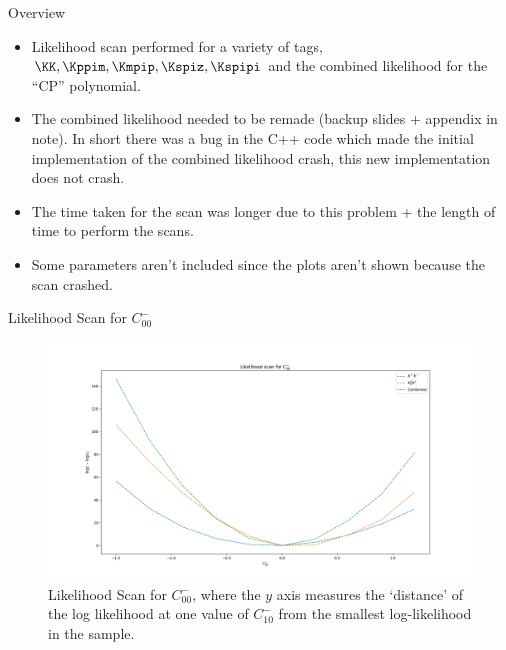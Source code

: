 \begin{frame}{Overview}
    \begin{itemize}
        \item Likelihood scan performed for a variety of tags, $\KK, \Kppim, \Kmpip, \Kspiz, \Kspipi$ and the combined likelihood for the ``CP'' polynomial.
        \item The combined likelihood needed to be remade (backup slides + appendix in note). In short there was a bug in the C++ code which made the initial implementation of the combined likelihood crash, this new implementation does not crash. 
        \item The time taken for the scan was longer due to this problem + the length of time to perform the scans.
        \item Some parameters aren't included since the plots aren't shown because the scan crashed.
    \end{itemize}
\end{frame}

\begin{frame}{Likelihood Scan for $C_{00}^{-}$}
\begin{figure}
    \centering
        \includegraphics[width=\textwidth]{2020_04_23/figs/M00_Norm.png}
    \caption{Likelihood Scan for $C_{00}^{-}$, where the $y$ axis measures the `distance' of the log likelihood at one value of $C_{10}^{-}$ from the smallest log-likelihood in the sample.}
    \label{fig:scanCM00}
\end{figure}
\end{frame}


